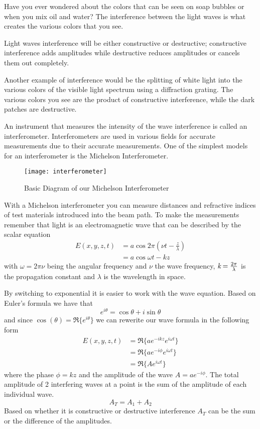 	Have you ever wondered about the colors that can be seen on soap bubbles or when you mix oil and water? The interference between the light waves is what creates the various colors  that you see.

	Light waves interference will be either constructive or destructive; constructive interference adds amplitudes while destructive reduces amplitudes or cancels them out completely.

	Another example of interference would be the splitting of white light into the various colors of the visible light spectrum using a diffraction grating. The various colors you see are the product of constructive interference, while the dark patches are destructive.

    An instrument that measures the intensity of the wave interference is called an interferometer. Interferometers are used in various fields for accurate measurements due to their accurate measurements. One of the simplest models for an interferometer is the Michelson Interferometer.

\begin{figure}[ht]
\centering
\texttt{[image: interferometer]}
\caption{Basic Diagram of our Michelson Interferometer}
\label{fig:interferometerdiagram}
\end{figure}


	With a Michelson interferometer you can measure distances and refractive indices of test materials introduced into the beam path. To make the measurements remember that light is an electromagnetic wave that can be described by the scalar equation
	\begin{align}\label{eqn:EMWave}
		\nonumber E(x,y,z,t) &= a\cos{2\pi(\nu t-\frac{z}{\lambda})} \\
		&= a\cos{\omega t-kz}
	\end{align}
with $\omega=2\pi\nu$ being the angular frequency and $\nu$ the wave frequency, $\emph{k}=\frac{2\pi}{\lambda}$ is the propagation constant and $\lambda$ is the wavelength in space.  

	By switching to exponential it is easier to work with the wave equation. Based on Euler’s formula we have that 
	\begin{equation}\label{eqn:Euler's}
		e^{i\theta} = \cos{\theta} + i \sin{\theta}
	\end{equation}
and since $\cos(\theta)=\Re\{e^{i\theta}\}$ we can rewerite our wave formula in the following form
	\begin{align}\label{eqn:TrigEMWave}
		\nonumber E(x,y,z,t) &=\Re\{a e^{-ikz} e^{i\omega t}\} \\
		\nonumber &=\Re\{a e^{-i\phi} e^{i\omega t}\} \\
		&=\Re\{A e^{i\omega t}\}
	\end{align}
where the phase $\phi=kz$ and the amplitude of the wave $A=ae^{-i\phi}$. The total amplitude of 2 interfering waves at a point is the sum of the amplitude of each individual wave.
	\begin{equation}\label{eqn:Amplitude}
		A_{T}=A_{1}+A_{2}
	\end{equation}
Based on whether it is constructive or destructive interference $A_T$ can be the sum or the difference of the amplitudes. 

